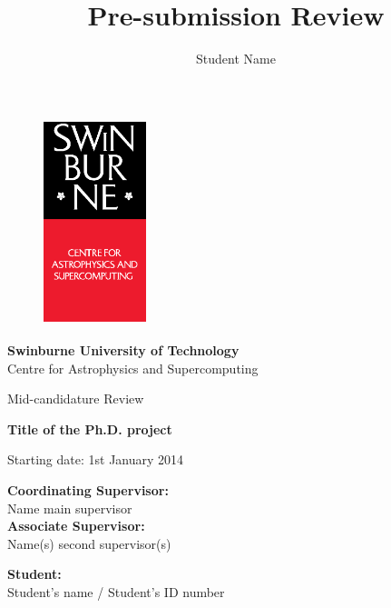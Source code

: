 \documentclass[useAMS,usenatbib,onecolumn]{mn2e}
\title{Pre-submission Review}
\author[Student Name]
 {Student Name}
\begin{document}
\fontsize{11}{12.5}\selectfont
\begin{center}

\begin{figure}
\begin{center}
\includegraphics[height=6cm,width=3cm]{./astro_v.eps}
\end{center}
\end{figure}

{\bf \LARGE S\Large winburne \LARGE U\Large niversity of  \LARGE T\Large echnology\\
\vspace{0.5cm}}
\LARGE C\Large entre for \LARGE A\Large strophysics and \LARGE S\Large upercomputing\\
\vspace{0.5cm}

\large Mid-candidature Review\\
\vspace{0.5cm}



\Huge{\bf Title of the Ph.D. project}

\vspace{3cm}
\large{Starting date: 1st January 2014}
\end{center}


\begin{flushleft}
{\bf Coordinating Supervisor:}\\
Name main supervisor\\
\vspace{0.5cm}
{\bf Associate Supervisor:}\\
Name(s) second supervisor(s)\\
\end{flushleft}

\begin{flushright}
{\bf Student:}\\
Student's name / Student's ID number
\end{flushright}\hspace{8cm}
\end{document}

